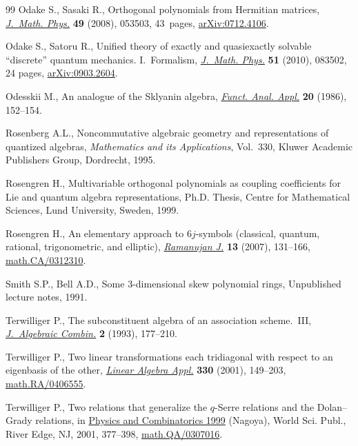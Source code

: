 \documentclass[pdftex]{sigma}
\numberwithin{equation}{section}
\begin{document}
\begin{thebibliography}{99}
Odake S., Sasaki R.,
Orthogonal polynomials from Hermitian matrices,
\href{http://dx.doi.org/10.1063/1.2898695}{{\it J.~Math. Phys.}} {\bf 49}  (2008),   053503,   43~pages,
\href{http://arxiv.org/abs/0712.4106}{arXiv:0712.4106}.

Odake S., Satoru R.,
Unif\/ied theory of exactly and quasiexactly solvable ``discrete'' quantum mechanics. I.~Formalism,
\href{http://dx.doi.org/10.1063/1.3458866}{{\it J.~Math. Phys.}} {\bf 51} (2010), 083502, 24 pages,
\href{http://arxiv.org/abs/0903.2604}{arXiv:0903.2604}.

Odesskii M.,
An analogue of the Sklyanin algebra,
\href{http://dx.doi.org/10.1007/BF01077280}{{\it Funct. Anal. Appl.}} {\bf 20} (1986), 152--154.


Rosenberg A.L.,
Noncommutative algebraic geometry and representations of quantized algebras,
{\it Mathe\-ma\-tics and its Applications}, Vol.~330, Kluwer Academic Publishers Group, Dordrecht, 1995.

Rosengren H.,
Multivariable orthogonal polynomials as coupling coef\/f\/icients for Lie and quantum algebra representations,
 Ph.D. Thesis, Centre for Mathematical Sciences, Lund University, Sweden, 1999.


Rosengren H.,
An elementary approach to $6j$-symbols (classical, quantum, rational, trigonometric, and elliptic),
\href{http://dx.doi.org/10.1007/s11139-006-0245-1}{{\it Ramanujan J.}} {\bf 13}  (2007), 131--166,
\href{http://arxiv.org/abs/math.CA/0312310}{math.CA/0312310}.

Smith S.P., Bell A.D.,
Some 3-dimensional skew polynomial rings, Unpublished lecture notes, 1991.



Terwilliger P.,
The subconstituent algebra of an association scheme.~III,
\href{http://dx.doi.org/10.1023/A:1022415825656}{{\it J.~Algebraic Combin.}} {\bf 2}  (1993), 177--210.

Terwilliger P.,
Two linear transformations each tridiagonal with respect to an eigenbasis of the other,
\href{http://dx.doi.org/10.1016/S0024-3795(01)00242-7}{{\it Linear Algebra Appl.}}  {\bf 330} (2001), 149--203,
\href{http://arxiv.org/abs/math.RA/0406555}{math.RA/0406555}.



Terwilliger P.,
Two relations that generalize the $q$-Serre relations and the  Dolan--Grady relations,
in  \href{http://dx.doi.org/10.1142/9789812810199_0013}{Physics and Combinatorics 1999} (Nagoya), World Sci. Publ., River Edge, NJ, 2001, 377--398,
\href{http://arxiv.org/abs/math.QA/0307016}{math.QA/0307016}.



\end{thebibliography}
\end{document}
